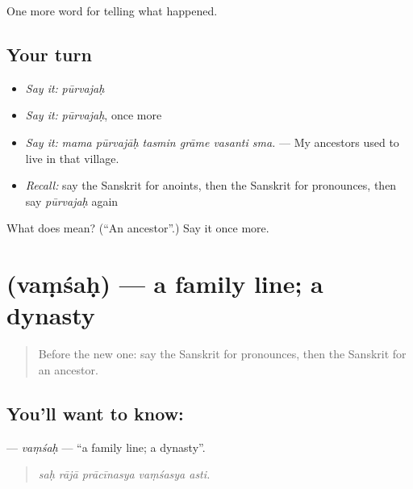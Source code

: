 \begin{grammarlens}[title={What you've built}]
One more word for telling what happened.
\end{grammarlens}

\subsection*{Your turn}
\begin{itemize}
\raggedright
  \item \emph{Say it:} \emph{pūrvajaḥ}
  \item \emph{Say it:} \emph{pūrvajaḥ}, once more
  \item \emph{Say it:} \emph{mama pūrvajāḥ tasmin grāme vasanti sma.} — My ancestors used to live in that village.
  \item \emph{Recall:} say the Sanskrit for anoints, then the Sanskrit for pronounces, then say \emph{pūrvajaḥ} again
\end{itemize}

\begin{tcolorbox}[breakable,colback=teal!4,colframe=teal!35!black,title={Before you move on}]
What does  mean? (\textquotedblleft{}An ancestor\textquotedblright{}.) Say it once more.
\end{tcolorbox}
\section[\texorpdfstring{\sk{वंशः} (vaṃśaḥ)}{वंशः (vaṃśaḥ)}]{ (vaṃśaḥ) — a family line; a dynasty}

\label{lesson:SA-C322-vamsah}



\begin{quote}
Before the new one: say the Sanskrit for pronounces, then the Sanskrit for an ancestor.
\end{quote}

\subsection*{You'll want to know: }
\textbf{} — \emph{vaṃśaḥ} — \textquotedblleft{}a family line; a dynasty\textquotedblright{}.

\begin{quote}
    
\end{quote}

\begin{quote}
\emph{saḥ rājā prācīnasya vaṃśasya asti.}
\end{quote}

